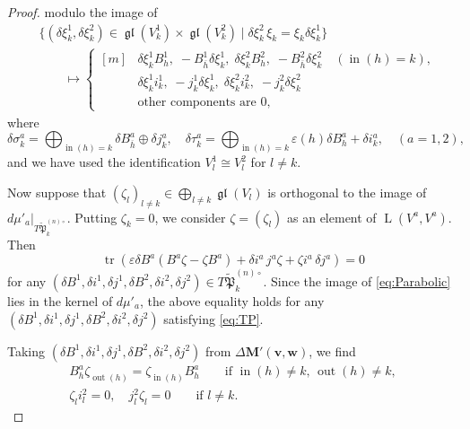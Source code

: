 \documentclass[12pt]{amsart}
\def\frak{\mathfrak}
\theoremstyle{definition}
\theoremstyle{remark}
\numberwithin{equation}{subsection}
\newcommand{\gl}{\operatorname{\frak{gl}}}
\newcommand{\tr}{\operatorname{tr}}
\newcommand{\vin}{\operatorname{in}} %
\newcommand{\vout}{\operatorname{out}} %
\newcommand{\bM}{{\mathbf M}} %
\newcommand{\bv}{{\mathbf v}} %
\newcommand{\bw}{{\mathbf w}} %
\newcommand{\Pa}{{\frak P}} %
\newcommand{\HomL}{\operatorname{L}}
\begin{document}
\begin{proof}
modulo the image of
\begin{equation}\label{eq:Parabolic}
\begin{split}
   & \{ (\delta\xi_k^1, \delta \xi_k^2) \in \gl(V_k^1)\times \gl(V^2_k)\mid
    \delta\xi_k^2\, \xi_k = \xi_k \delta\xi_k^1 \} \\
   & \qquad \longmapsto 
  \left\{
   \begin{aligned}[m]
    &\delta\xi_k^1 B^1_h, \; - B^1_{\overline h}\delta\xi_k^1, \;
    \delta\xi_k^2 B^2_h, \; - B^2_{\overline h}\delta\xi_k^2
     \quad(\vin(h) = k), \\
    & \delta\xi_k^1 i_k^1, \; -j_k^1 \delta\xi_k^1,\;
    \delta\xi_k^2 i_k^2, \; -j_k^2 \delta\xi_k^2\\
    & \text{other components are $0$},
   \end{aligned}
   \right.
\end{split}
\end{equation}
where
\begin{equation*}
  \delta\sigma_k^a
    = \bigoplus_{\vin(h)=k}\delta B_{\overline{h}}^a\oplus\delta j_k^a,
  \quad
  \delta\tau_k^a
    = \bigoplus_{\vin(h)=k}\varepsilon(h)\delta B_h^a + \delta i_k^a,
  \quad (a=1,2),
\end{equation*}
and we have used the identification $V^1_l \cong V^2_l$ for $l\neq
k$.

Now suppose that $(\zeta_l)_{l\neq k} \in \bigoplus_{l\neq k}
\gl(V_l)$ is orthogonal to the image of
$d\mu'_a|_{T\widetilde\Pa_k^{(n)\circ}}$.
Putting $\zeta_k = 0$, we consider $\zeta = (\zeta_l)$ as an
element of $\HomL(V^a,V^a)$. 
Then
\begin{equation*}
   \tr\left(\varepsilon \delta B^a(B^a\zeta - \zeta B^a) 
     + \delta i^a\, j^a\zeta + \zeta i^a\, \delta j^a\right) = 0
\end{equation*}
for any $(\delta B^1, \delta i^1, \delta j^1, \delta B^2, \delta
i^2, \delta j^2)\in T\widetilde\Pa_k^{(n)\circ}$.
Since the image of \eqref{eq:Parabolic} lies in the kernel
of $d\mu'_a$, the above equality holds for any
$(\delta B^1, \delta i^1, \delta j^1, \delta B^2, \delta
i^2, \delta j^2)$ satisfying \eqref{eq:TP}.

Taking $(\delta B^1, \delta i^1, \delta j^1, \delta B^2, \delta
i^2, \delta j^2)$ from $\Delta\bM'(\bv,\bw)$, we find
\begin{equation}
\label{eq:notk}
\begin{gathered}
   B_h^a\zeta_{\vout(h)} = \zeta_{\vin(h)} B_h^a\qquad
    \text{if $\vin(h)\neq k$, $\vout(h)\neq k$},\\
   \zeta_l i^2_l = 0, \quad j_l^2 \zeta_l = 0\qquad 
   \text{if $l\neq k$}.
\end{gathered}
\end{equation}


\end{proof}
\end{document}
